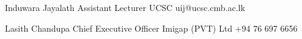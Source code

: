 

\begin{cventries}

  \cventry
  {Induwara Jayalath} %
  {Assistant Lecturer} %
  {UCSC} %
  {uij@ucsc.cmb.ac.lk} %
  {
  }

  \cventry
  {Lasith Chandupa } %
  {Chief Executive Officer} %
  {Imigap (PVT) Ltd} %
  {+94 76 697 6656} %
  {
  }

\end{cventries}
